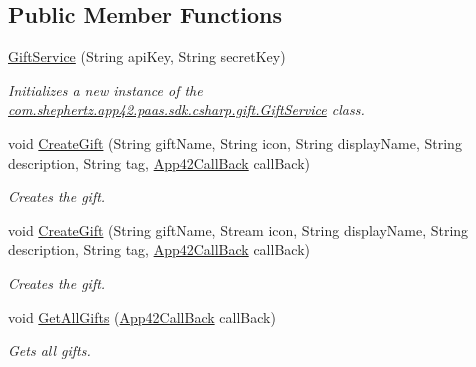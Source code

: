 \subsection*{Public Member Functions}
\begin{DoxyCompactItemize}
\item 
\hyperlink{classcom_1_1shephertz_1_1app42_1_1paas_1_1sdk_1_1csharp_1_1gift_1_1_gift_service_aebc426d6d72d1609f5c214c085345506}{Gift\+Service} (String api\+Key, String secret\+Key)
\begin{DoxyCompactList}\small\item\em Initializes a new instance of the \hyperlink{classcom_1_1shephertz_1_1app42_1_1paas_1_1sdk_1_1csharp_1_1gift_1_1_gift_service}{com.\+shephertz.\+app42.\+paas.\+sdk.\+csharp.\+gift.\+Gift\+Service} class. \end{DoxyCompactList}\item 
void \hyperlink{classcom_1_1shephertz_1_1app42_1_1paas_1_1sdk_1_1csharp_1_1gift_1_1_gift_service_af476a9b0255fe169c76b9a21824ff140}{Create\+Gift} (String gift\+Name, String icon, String display\+Name, String description, String tag, \hyperlink{interfacecom_1_1shephertz_1_1app42_1_1paas_1_1sdk_1_1csharp_1_1_app42_call_back}{App42\+Call\+Back} call\+Back)
\begin{DoxyCompactList}\small\item\em Creates the gift. \end{DoxyCompactList}\item 
void \hyperlink{classcom_1_1shephertz_1_1app42_1_1paas_1_1sdk_1_1csharp_1_1gift_1_1_gift_service_acf344e2d32a409b2fe04e5683d88c936}{Create\+Gift} (String gift\+Name, Stream icon, String display\+Name, String description, String tag, \hyperlink{interfacecom_1_1shephertz_1_1app42_1_1paas_1_1sdk_1_1csharp_1_1_app42_call_back}{App42\+Call\+Back} call\+Back)
\begin{DoxyCompactList}\small\item\em Creates the gift. \end{DoxyCompactList}\item 
void \hyperlink{classcom_1_1shephertz_1_1app42_1_1paas_1_1sdk_1_1csharp_1_1gift_1_1_gift_service_aae17528e16c86ceffb7ccbf3fc4636fe}{Get\+All\+Gifts} (\hyperlink{interfacecom_1_1shephertz_1_1app42_1_1paas_1_1sdk_1_1csharp_1_1_app42_call_back}{App42\+Call\+Back} call\+Back)
\begin{DoxyCompactList}\small\item\em Gets all gifts. \end{DoxyCompactList}\item 

\end{DoxyCompactItemize}
